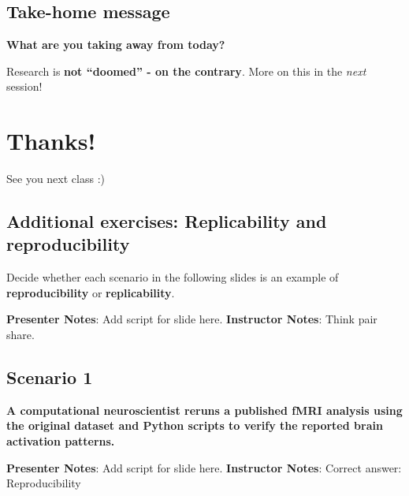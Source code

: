 \documentclass[
  letterpaper,
  DIV=11,
  numbers=noendperiod]{scrartcl}
\begin{document}
\subsection{Take-home message}\label{take-home-message-1}

\textbf{What are you taking away from today?}

\begin{tcolorbox}[enhanced jigsaw, arc=.35mm, bottomrule=.15mm, bottomtitle=1mm, breakable, colback=white, colbacktitle=quarto-callout-tip-color!10!white, colframe=quarto-callout-tip-color-frame, coltitle=black, left=2mm, leftrule=.75mm, opacityback=0, opacitybacktitle=0.6, rightrule=.15mm, title=\textcolor{quarto-callout-tip-color}{\faLightbulb}\hspace{0.5em}{Remember: There are solutions!}, titlerule=0mm, toprule=.15mm, toptitle=1mm]

Research is \textbf{not ``doomed'' - on the contrary}. More on this in
the \emph{next} session!

\end{tcolorbox}

\section{\texorpdfstring{Thanks! }{Thanks!  }}\label{thanks}

See you next class :)

\subsection{Additional exercises: Replicability and
reproducibility}\label{additional-exercises-replicability-and-reproducibility}

Decide whether each scenario in the following slides is an example of
\textbf{reproducibility} or \textbf{replicability}.

\textbf{Presenter Notes}: Add script for slide here. \textbf{Instructor
Notes}: Think pair share.

\subsection{Scenario 1}\label{scenario-1}

\textbf{A computational neuroscientist reruns a published fMRI analysis
using the original dataset and Python scripts to verify the reported
brain activation patterns.}

\textbf{Presenter Notes}: Add script for slide here. \textbf{Instructor
Notes}: Correct answer: Reproducibility
\end{document}

